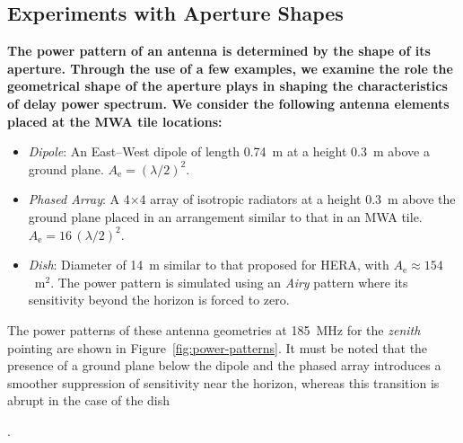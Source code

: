 \documentclass[preprint2,iop,numberedappendix]{emulateapj}
\begin{document}
\subsection{Experiments with Aperture Shapes}\label{sec:apertures}

{\bf The power pattern of an antenna is determined by the shape of its aperture. Through the use of a few examples, we examine the role the geometrical shape of the aperture plays in shaping the characteristics of delay power spectrum. We consider the following antenna elements placed at the MWA tile locations:
\begin{itemize}
\item {\it Dipole}: An East--West dipole of length 0.74~m at a height 0.3~m above a ground plane. $A_\textrm{e}=(\lambda/2)^2$.
\item {\it Phased Array}: A 4$\times$4 array of isotropic radiators at a height 0.3~m above the ground plane placed in an arrangement similar to that in an MWA tile. $A_\textrm{e}=16\,(\lambda/2)^2$. 
\item {\it Dish}: Diameter of 14~m similar to that proposed for HERA, with $A_\textrm{e}\approx 154$~m$^2$. The power pattern is simulated using an {\it Airy} pattern where its sensitivity beyond the horizon is forced to zero.
\end{itemize}

The power patterns of these antenna geometries at 185~MHz for the {\it zenith} pointing are shown in Figure~\ref{fig:power-patterns}. It must be noted that the presence of a ground plane below the dipole and the phased array introduces a smoother suppression of sensitivity near the horizon, whereas this transition is abrupt in the case of the dish}. 
\end{document}
